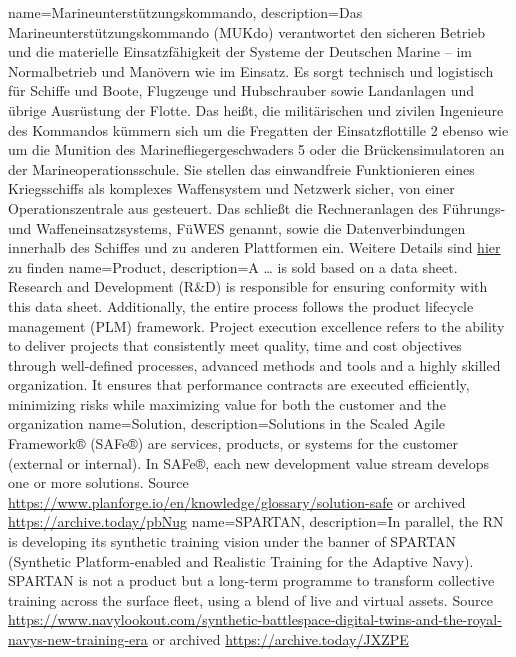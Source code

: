 {%
	name=Marineunterstützungskommando,%
	description={Das Marineunterstützungskommando (MUKdo) verantwortet den sicheren Betrieb und die materielle Einsatzfähigkeit der Systeme der Deutschen Marine %
	    – im Normalbetrieb und Manövern wie im Einsatz. Es sorgt technisch und logistisch für Schiffe und Boote, Flugzeuge und Hubschrauber sowie Landanlagen und übrige Ausrüstung der Flotte. %
		Das heißt, die militärischen und zivilen Ingenieure des Kommandos kümmern sich um die Fregatten der Einsatzflottille 2 ebenso wie um die Munition des Marinefliegergeschwaders 5 %
		oder die Brückensimulatoren an der Marineoperationsschule. Sie stellen das einwandfreie Funktionieren eines Kriegsschiffs als komplexes Waffensystem und Netzwerk sicher, %
		von einer Operationszentrale aus gesteuert. %
		Das schließt die Rechneranlagen des Führungs- und Waffeneinsatzsystems, FüWES genannt, sowie die Datenverbindungen innerhalb des Schiffes und zu anderen Plattformen ein. %
		Weitere Details sind \href{https://www.bundeswehr.de/de/organisation/marine/struktur/marineunterstuetzungskommando}{hier} zu finden}%
}
%
{%
	name=Product,%
	description={A \dots{} is sold based on a data sheet. %
		Research and Development (R\&D) is responsible for ensuring conformity with this data sheet. %
		Additionally, the entire process follows the product lifecycle management (PLM) framework. %
		Project execution excellence refers to the ability to deliver projects that consistently meet quality, %
		time and cost objectives through well-defined processes, advanced methods and tools and a highly skilled organization. %
		It ensures that performance contracts are executed efficiently, %
		minimizing risks while maximizing value for both the customer and the organization}%
}
%
{%
	name=Solution,%
	description={Solutions in the Scaled Agile Framework® (SAFe®) are services, products, or systems for the customer (external or internal). %
		In SAFe®, each new development value stream develops one or more solutions. %
		Source \url{https://www.planforge.io/en/knowledge/glossary/solution-safe} or archived \url{https://archive.today/pbNug}%
	}%
}
%
{%
	name=SPARTAN,%
	description={In parallel, the RN is developing its synthetic training vision under the banner of %
		SPARTAN (Synthetic Platform-enabled and Realistic Training for the Adaptive Navy). %
		SPARTAN is not a product but a long-term programme to transform collective training across the surface fleet, %
		using a blend of live and virtual assets. %
		Source \url{https://www.navylookout.com/synthetic-battlespace-digital-twins-and-the-royal-navys-new-training-era} %
		or archived \url{https://archive.today/JXZPE}%
	}%
}
